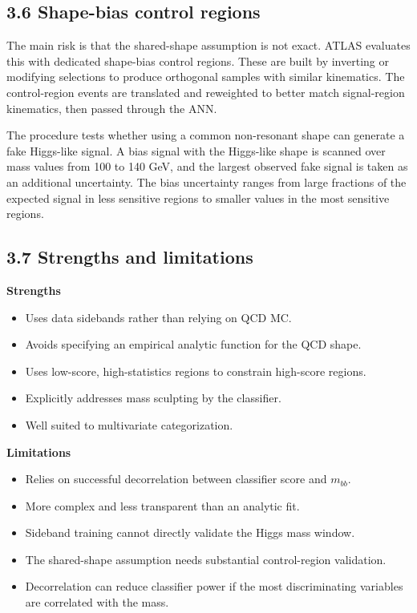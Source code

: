 \documentclass[11pt]{article}
\begin{document}
\subsection{3.6 Shape-bias control regions}

The main risk is that the shared-shape assumption is not exact. ATLAS evaluates this with dedicated shape-bias control regions. These are built by inverting or modifying selections to produce orthogonal samples with similar kinematics. The control-region events are translated and reweighted to better match signal-region kinematics, then passed through the ANN.

The procedure tests whether using a common non-resonant shape can generate a fake Higgs-like signal. A bias signal with the Higgs-like shape is scanned over mass values from 100 to 140 GeV, and the largest observed fake signal is taken as an additional uncertainty. The bias uncertainty ranges from large fractions of the expected signal in less sensitive regions to smaller values in the most sensitive regions.

\subsection{3.7 Strengths and limitations}

\textbf{Strengths}

\begin{itemize}
\item Uses data sidebands rather than relying on QCD MC.
\item Avoids specifying an empirical analytic function for the QCD shape.
\item Uses low-score, high-statistics regions to constrain high-score regions.
\item Explicitly addresses mass sculpting by the classifier.
\item Well suited to multivariate categorization.
\end{itemize}

\textbf{Limitations}

\begin{itemize}
\item Relies on successful decorrelation between classifier score and \(m_{bb}\).
\item More complex and less transparent than an analytic fit.
\item Sideband training cannot directly validate the Higgs mass window.
\item The shared-shape assumption needs substantial control-region validation.
\item Decorrelation can reduce classifier power if the most discriminating variables are correlated with the mass.
\end{itemize}
\end{document}
